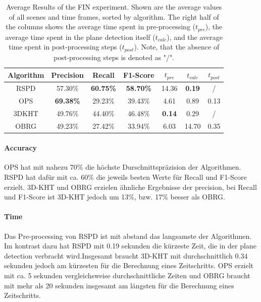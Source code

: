 \documentclass[main.tex]{subfiles}
\begin{document}
\begin{table}[H]
    \centering
    \begin{tabular}{c|cccccc}
        Algorithm & Precision        & Recall           & F1-Score         & $t_{pre}$     & $t_{calc}$    & $t_{post}$ \\ \hline
        RSPD      & 57.30\%          & \textbf{60.75\%} & \textbf{58.70\%} & 14.36         & \textbf{0.19} & /          \\
        OPS       & \textbf{69.38\%} & 29.23\%          & 39.43\%          & 4.61          & 0.89          & 0.13       \\
        3DKHT     & 49.76\%          & 44.40\%          & 46.48\%          & \textbf{0.14} & 0.29          & /          \\
        OBRG      & 49.23\%          & 27.42\%          & 33.94\%          & 6.03          & 14.70         & 0.35
    \end{tabular}
    \caption[Average FIN Results]{Average Results of the FIN experiment. Shown are the average values of all scenes and time frames, sorted by
        algorithm. The right half of the columns shows the average time spent in pre-processing ($t_{pre}$), the average time spent in the plane
        detection itself ($t_{calc}$), and the average time spent in post-processing steps ($t_{post}$).
        Note, that the absence of post-processing steps is denoted as "/".}
    \label{tab:res-fin-total}
\end{table}

\paragraph{Accuracy}
OPS hat mit nahezu 70\% die höchste Durschnittspräzision der Algorithmen. RSPD hat dafür mit ca. 60\% die jeweils besten
Werte für Recall und F1-Score erzielt. 3D-KHT und OBRG erzielen ähnliche Ergebnisse der precision, bei Recall und
F1-Score ist 3D-KHT jedoch um 13\%, bzw. 17\% besser als OBRG.
\paragraph{Time}
Das Pre-processing von RSPD ist mit abstand das langsamste der Algorithmen. Im kontrast dazu hat RSPD mit 0.19 sekunden
die kürzeste Zeit, die in der plane detection verbracht wird.Insgesamt braucht 3D-KHT mit durchschnittlich $0.34$
sekunden jedoch am kürzesten für die Berechnung eines Zeitschritts. OPS erzielt mit ca. 5 sekunden vergleichsweise
durchschnittliche Zeiten und OBRG braucht mit mehr als 20 sekunden insgesamt am längsten für die Berechnung
eines Zeitschritts.
\end{document}
